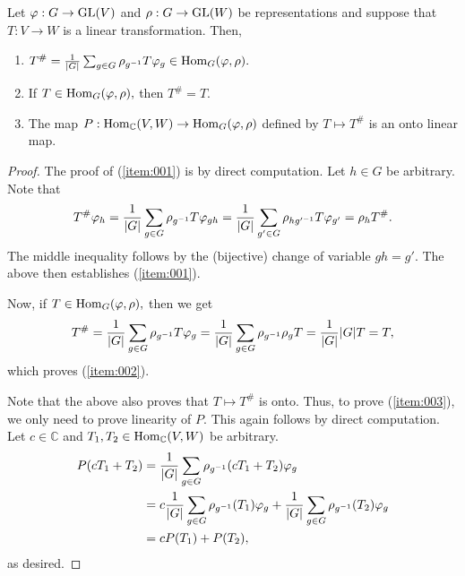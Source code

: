 \begin{prop} \label{prop:Thash}
	Let $\varphi : G \to \operatorname{GL}(V)$ and $\rho : G \to \operatorname{GL}(W)$ be representations and suppose that $T : V \to W$ is a linear transformation. Then,
	\begin{enumerate}
		\item\label{item:001} $T^{\#} = \frac{1}{{\left\lvert G \right\lvert}}\sum_{g \in G} \rho_{g^{-1}}T\varphi_g \in \operatorname{Hom}_{G}(\varphi, \rho).$
		\item\label{item:002} If $T \in \operatorname{Hom}_{G}(\varphi, \rho),$ then $T^{\#} = T.$
		\item\label{item:003} The map $P : \operatorname{Hom}_{\mathbb{C}}(V, W) \to \operatorname{Hom}_{G}(\varphi, \rho)$ defined by $T \mapsto T^{\#}$ is an onto linear map.
	\end{enumerate}
\end{prop}
\begin{proof} 
	The proof of (\ref{item:001}) is by direct computation. Let $h \in G$ be arbitrary. Note that
	\begin{equation*} 
		T^{\#}\varphi_h = \frac{1}{{\left\lvert G \right\lvert}}\sum_{g \in G} \rho_{g^{-1}}T\varphi_{gh} = \frac{1}{{\left\lvert G \right\lvert}}\sum_{g' \in G} \rho_{hg'^{-1}}T\varphi_{g'} = \rho_hT^{\#}.
	\end{equation*}
	The middle inequality follows by the (bijective) change of variable $gh = g'.$ The above then establishes (\ref{item:001}).

	Now, if $T \in \operatorname{Hom}_{G}(\varphi, \rho),$ then we get
	\begin{equation*} 
		T^{\#} =  \frac{1}{{\left\lvert G \right\lvert}}\sum_{g \in G} \rho_{g^{-1}}T\varphi_g = \frac{1}{{\left\lvert G \right\lvert}}\sum_{g \in G} \rho_{g^{-1}}\rho_gT = \frac{1}{{\left\lvert G \right\lvert}}{\left\lvert G \right\lvert}T = T,
	\end{equation*}
	which proves (\ref{item:002}).

	Note that the above also proves that $T \mapsto T^{\#}$ is onto. Thus, to prove (\ref{item:003}), we only need to prove linearity of $P.$ This again follows by direct computation. Let $c \in \mathbb{C}$ and $T_1, T_2 \in \operatorname{Hom}_{\mathbb{C}}(V, W)$ be arbitrary.
	\begin{align*} 
		P(cT_1 + T_2) &= \frac{1}{{\left\lvert G \right\lvert}}\sum_{g \in G} \rho_{g^{-1}}(cT_1 + T_2)\varphi_g\\
		&=c\frac{1}{{\left\lvert G \right\lvert}}\sum_{g \in G} \rho_{g^{-1}}(T_1)\varphi_g + \frac{1}{{\left\lvert G \right\lvert}}\sum_{g \in G} \rho_{g^{-1}}(T_2)\varphi_g\\
		&= cP(T_1) + P(T_2),
	\end{align*}
	as desired.
\end{proof}

